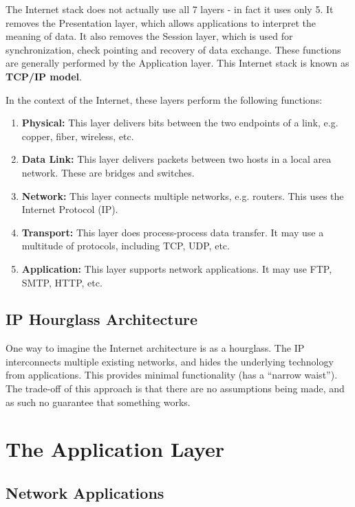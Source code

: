 \documentclass[12pt,letterpaper]{book}
\theoremstyle{definition}
\begin{document}
The Internet stack does not actually use all 7 layers - in fact it uses only 5. It removes the Presentation layer, which allows applications to interpret the meaning of data. It also removes the Session layer, which is used for synchronization, check pointing and recovery of data exchange. These functions are generally performed by the Application layer. This Internet stack is known as \textbf{TCP/IP model}.

In the context of the Internet, these layers perform the following functions:

\begin{enumerate}
  \item \textbf{Physical:} This layer delivers bits between the two endpoints of a link, e.g. copper, fiber, wireless, etc.
  \item \textbf{Data Link:} This layer delivers packets between two hosts in a local area network. These are bridges and switches.
  \item \textbf{Network:} This layer connects multiple networks, e.g. routers. This uses the Internet Protocol (IP).
  \item \textbf{Transport:} This layer does process-process data transfer. It may use a multitude of protocols, including TCP, UDP, etc.
  \item \textbf{Application:} This layer supports network applications. It may use FTP, SMTP, HTTP, etc.
\end{enumerate}

\section{IP Hourglass Architecture}

One way to imagine the Internet architecture is as a hourglass. The IP interconnects multiple existing networks, and hides the underlying technology from applications. This provides minimal functionality (has a ``narrow waist''). The trade-off of this approach is that there are no assumptions being made, and as such no guarantee that something works.

\chapter{The Application Layer}

\section{Network Applications}
\end{document}
